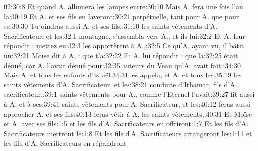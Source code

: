 \begin{multicols}{3}
{02:30:8	Et quand A. allumera les lampes entre:30:10	Mais A. fera une fois l'an la:30:19	Et A. et ses fils en laveront:30:21	perpétuelle, tant pour A. que pour sa:30:30	Tu oindras aussi A. et ses fils,:31:10	les saints vêtements d'A. Sacrificateur, et les:32:1	montagne, s'assembla vers A., et ils lui:32:2	Et A. leur répondit : mettez en:32:3	les apportèrent à A.,:32:5	Ce qu'A. ayant vu, il bâtit un:32:21	Moïse dit à A. : que t'a:32:22	Et A. lui répondit : que la:32:25	était dénué, car A. l'avait dénué pour:32:35	auteurs du Veau qu'A. avait fait.:34:30	Mais A. et tous les enfants d'Israël:34:31	les appela, et A. et tous les:35:19	les saints vêtements d'A. Sacrificateur, et les:38:21	conduite d'Ithamar, fils d'A., sacrificateur.:39:1	saints vêtements pour A., comme l'Eternel l'avait:39:27	fit aussi à A. et à ses:39:41	saints vêtements pour A. Sacrificateur, et les:40:12	feras aussi approcher A. et ses fils:40:13	feras vêtir à A. les saints vêtements,:40:31	Et Moïse et A. avec ses fils:1:5	et les fils d'A. Sacrificateurs en offriront:1:7	Et les fils d'A. Sacrificateurs mettront le:1:8	Et les fils d'A. Sacrificateurs arrangeront les:1:11	et les fils d'A. Sacrificateurs en répandront\newline
}
\end{multicols}
